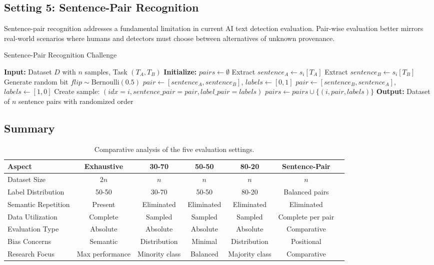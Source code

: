 \subsection{Setting 5: Sentence-Pair Recognition}
\label{appD:setup5}
Sentence-pair recognition addresses a fundamental limitation in current AI text detection evaluation. Pair-wise evaluation better mirrors real-world scenarios where humans and detectors must choose between alternatives of unknown provenance.

\begin{algorithm}[H]
\caption{Sentence-Pair Recognition Challenge}
\begin{algorithmic}[1]
\STATE \textbf{Input:} Dataset $D$ with $n$ samples, Task $(T_A, T_B)$
\STATE \textbf{Initialize:} $pairs \leftarrow \emptyset$
    \STATE Extract $sentence_A \leftarrow s_i[T_A]$
    \STATE Extract $sentence_B \leftarrow s_i[T_B]$
    \STATE Generate random bit $flip \sim \text{Bernoulli}(0.5)$
        \STATE $pair \leftarrow [sentence_A, sentence_B]$, $labels \leftarrow [0, 1]$
    \ELSE
        \STATE $pair \leftarrow [sentence_B, sentence_A]$, $labels \leftarrow [1, 0]$
    \ENDIF
    \STATE Create sample: $(idx=i, sentence\_pair=pair, label\_pair=labels)$
    \STATE $pairs \leftarrow pairs \cup \{(i, pair, labels)\}$
\ENDFOR
\STATE \textbf{Output:} Dataset of $n$ sentence pairs with randomized order
\end{algorithmic}
\end{algorithm}

\subsection{Summary}

\begin{table}[t]
\centering
\caption{Comparative analysis of the five evaluation settings.}
\label{tab:setup_comparison}
\begin{tabular}{@{}lcccccc@{}}
\toprule
\textbf{Aspect} & \textbf{Exhaustive} & \textbf{30-70} & \textbf{50-50} & \textbf{80-20} & \textbf{Sentence-Pair} \\
\midrule
Dataset Size & $2n$ & $n$ & $n$ & $n$ & $n$ \\
Label Distribution & 50-50 & 30-70 & 50-50 & 80-20 & Balanced pairs \\
Semantic Repetition & Present & Eliminated & Eliminated & Eliminated & Eliminated \\
Data Utilization & Complete & Sampled & Sampled & Sampled & Complete per pair \\
Evaluation Type & Absolute & Absolute & Absolute & Absolute & Comparative \\
Bias Concerns & Semantic & Distribution & Minimal & Distribution & Positional \\
Research Focus & Max performance & Minority class & Balanced & Majority class & Comparative \\
\bottomrule
\end{tabular}
\end{table}

